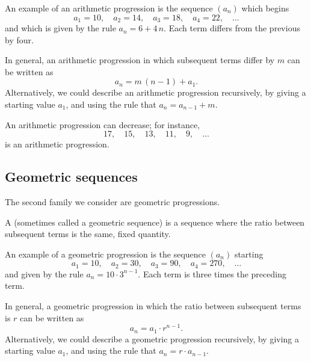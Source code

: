 \begin{example}
  An example of an arithmetic progression is the sequence $(a_n)$ which begins 
  $$
  a_1 = 10, \quad a_2 = 14, \quad a_3 = 18, \quad a_4 = 22, \quad\ldots
  $$
  and which is given by the rule $a_n = 6 + 4 \, n$.  Each term differs
  from the previous by four.
\end{example}

In general, an arithmetic progression in which subsequent terms differ
by $m$ can be written as
$$
a_n = m \, (n-1) + a_1.
$$
Alternatively, we could describe an arithmetic progression
recursively, by giving a starting value $a_1$, and using the rule that
$a_{n} = a_{n-1} + m$.


An arithmetic progression can decrease; for instance,
$$
17,\quad  15,\quad  13,\quad  11,\quad  9, \quad\ldots
$$
is an arithmetic progression.

\subsection{Geometric sequences}
\label{subsection:geometric-sequences}

The second family we consider are geometric progressions.

\begin{definition}
  A  (sometimes called a geometric
  sequence) is a sequence where the ratio
  between subsequent terms is the same, fixed quantity.
\end{definition}

\begin{example}
  An example of a geometric progression is the sequence $(a_n)$ starting
  $$
  a_1 = 10, \quad a_2 = 30, \quad a_3 = 90, \quad a_4 = 270, \quad\ldots
  $$
  and given by the rule $a_n = 10 \cdot 3^{n-1}$.  Each term is three
  times the preceding term.
\end{example}

In general, a geometric progression in which the ratio between
subsequent terms is $r$ can be written as
$$
a_n = a_1 \cdot r^{n-1}.
$$
Alternatively, we could describe a geometric progression
recursively, by giving a starting value $a_1$, and using the rule that
$a_{n} = r \cdot a_{n-1}$.

